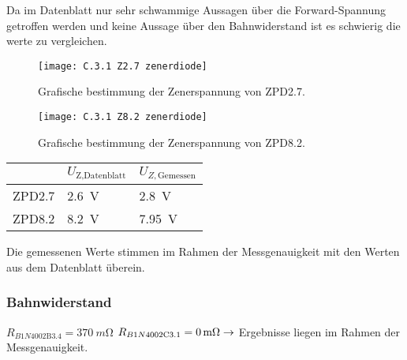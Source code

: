 \documentclass[
	a4paper, %
	12pt, %
]{CSUniSchoolLabReport}
\newcommand{\milli}{m}
\begin{document}
Da im Datenblatt nur sehr schwammige Aussagen über die Forward-Spannung getroffen werden und keine Aussage über den Bahnwiderstand ist es schwierig die werte zu vergleichen.

\begin{figure}[H] %
	\centering %
	\texttt{[image: C.3.1 Z2.7 zenerdiode]} %
	\caption{Grafische bestimmung der Zenerspannung von ZPD2.7.}
\end{figure}

\vspace{3em}

\begin{figure}[H] %
	\centering %
	\texttt{[image: C.3.1 Z8.2 zenerdiode]} %
	\caption{Grafische bestimmung der Zenerspannung von ZPD8.2.}
\end{figure}

\begin{table}[H]
\centering
\begin{tabular}{l|ll}
                            & $U_{\text{Z,Datenblatt}}$ & $U_{Z,\text{Gemessen}}$ \\
\hline
ZPD2.7                      &\SI{2,6}{\volt}                        &\SI{2,8}{\volt}                      \\
\hline
ZPD8.2                      &\SI{8,2}{\volt}                        &\SI{7,95}{\volt}                      \\                       
\end{tabular}
\end{table}

Die gemessenen Werte stimmen im Rahmen der Messgenauigkeit mit den Werten aus dem Datenblatt überein.

\subsubsection{Bahnwiderstand}
$R_{B1N4002\text{B3.4}} = \SI{370}{\milli\ohm}$ \qquad\qquad $R_{B1N4002\text{C3.1}} = \SI{0}{\milli\ohm}\\\\
\rightarrow $ Ergebnisse liegen im Rahmen der Messgenauigkeit. 
\end{document}

